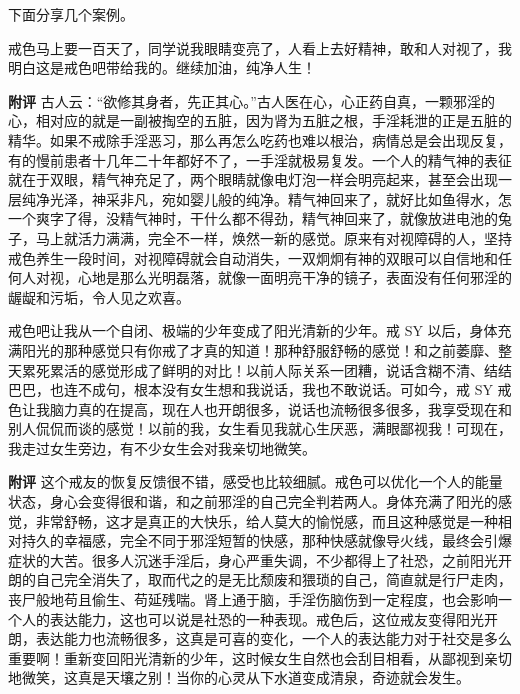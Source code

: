 下面分享几个案例。

\begin{case}
    戒色马上要一百天了，同学说我眼睛变亮了，人看上去好精神，敢和人对视了，我明白这是戒色吧带给我的。继续加油，纯净人生！

    \textbf{附评} 古人云：“欲修其身者，先正其心。”古人医在心，心正药自真，一颗邪淫的心，相对应的就是一副被掏空的五脏，因为肾为五脏之根，手淫耗泄的正是五脏的精华。如果不戒除手淫恶习，那么再怎么吃药也难以根治，病情总是会出现反复，有的慢前患者十几年二十年都好不了，一手淫就极易复发。一个人的精气神的表征就在于双眼，精气神充足了，两个眼睛就像电灯泡一样会明亮起来，甚至会出现一层纯净光泽，神采非凡，宛如婴儿般的纯净。精气神回来了，就好比如鱼得水，怎一个爽字了得，没精气神时，干什么都不得劲，精气神回来了，就像放进电池的兔子，马上就活力满满，完全不一样，焕然一新的感觉。原来有对视障碍的人，坚持戒色养生一段时间，对视障碍就会自动消失，一双炯炯有神的双眼可以自信地和任何人对视，心地是那么光明磊落，就像一面明亮干净的镜子，表面没有任何邪淫的龌龊和污垢，令人见之欢喜。
\end{case}

\begin{case}
    戒色吧让我从一个自闭、极端的少年变成了阳光清新的少年。戒 SY 以后，身体充满阳光的那种感觉只有你戒了才真的知道！那种舒服舒畅的感觉！和之前萎靡、整天累死累活的感觉形成了鲜明的对比！以前人际关系一团糟，说话含糊不清、结结巴巴，也连不成句，根本没有女生想和我说话，我也不敢说话。可如今，戒 SY 戒色让我脑力真的在提高，现在人也开朗很多，说话也流畅很多很多，我享受现在和别人侃侃而谈的感觉！以前的我，女生看见我就心生厌恶，满眼鄙视我！可现在，我走过女生旁边，有不少女生会对我亲切地微笑。

    \textbf{附评} 这个戒友的恢复反馈很不错，感受也比较细腻。戒色可以优化一个人的能量状态，身心会变得很和谐，和之前邪淫的自己完全判若两人。身体充满了阳光的感觉，非常舒畅，这才是真正的大快乐，给人莫大的愉悦感，而且这种感觉是一种相对持久的幸福感，完全不同于邪淫短暂的快感，那种快感就像导火线，最终会引爆症状的大苦。很多人沉迷手淫后，身心严重失调，不少都得上了社恐，之前阳光开朗的自己完全消失了，取而代之的是无比颓废和猥琐的自己，简直就是行尸走肉，丧尸般地苟且偷生、苟延残喘。肾上通于脑，手淫伤脑伤到一定程度，也会影响一个人的表达能力，这也可以说是社恐的一种表现。戒色后，这位戒友变得阳光开朗，表达能力也流畅很多，这真是可喜的变化，一个人的表达能力对于社交是多么重要啊！重新变回阳光清新的少年，这时候女生自然也会刮目相看，从鄙视到亲切地微笑，这真是天壤之别！当你的心灵从下水道变成清泉，奇迹就会发生。
\end{case}

